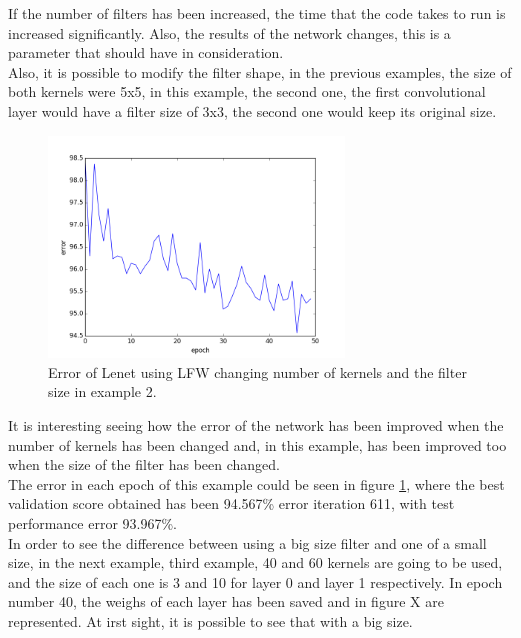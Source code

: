 If the number of filters has been increased, the time that the code takes to run is increased significantly. Also, the results of the network changes, this is a parameter that should have in consideration.\\

Also, it is possible to modify the filter shape, in the previous examples, the size of both kernels were 5x5, in this example, the second one, the first convolutional layer would have a filter size of 3x3, the second one would keep its original size.\\

\begin{figure}[htb]
\centering
\includegraphics[width=0.7\textwidth]{images/LFW_layers/error_conv_40_60_2.png}
\caption{Error of Lenet using LFW changing number of kernels and the filter size in example 2.} \label{fig:LENETLFW_ker2}
\end{figure}

It is interesting seeing how the error of the network has been improved when the number of kernels has been changed and, in this example, has been improved too when the size of the filter has been changed.\\

The error in each epoch of this example could be seen in figure \ref{fig:LENETLFW_ker2}, where the best validation score obtained has been 94.567\% error iteration 611, with test performance error 93.967\%.\\

In order to see the difference between using a big size filter and one of a small size, in the next example, third example, 40 and 60 kernels are going to be used, and the size of each one is 3 and 10 for layer 0 and layer 1 respectively. In epoch number 40, the weighs of each layer has been saved and in figure X are represented. At irst sight, it is possible to see that with a big size.\\

